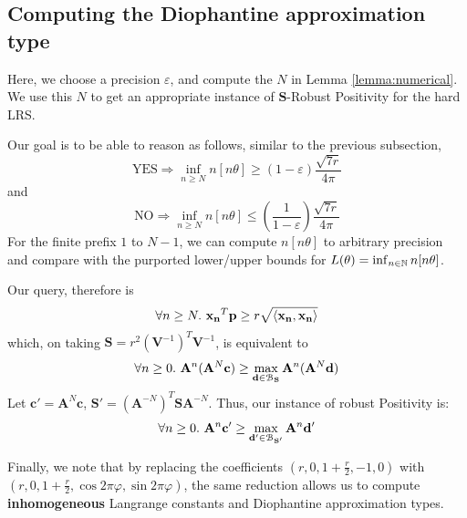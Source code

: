 \subsection{Computing the Diophantine approximation type}
Here, we choose a precision $\varepsilon$, and compute the $N$ in Lemma \ref{lemma:numerical}. We use this $N$ to get an appropriate instance of $\mathbf{S}$-Robust Positivity for the hard LRS. 

Our goal is to be able to reason as follows, similar to the previous subsection, 
$$
\text{YES} \Rightarrow \inf_{n \ge N} n[n\theta] \ge (1 - \varepsilon)\frac{\sqrt{7r}}{4\pi}
$$
and
$$
\text{NO} \Rightarrow \inf_{n \ge N} n[n\theta] \le \left(\frac{1}{1-\varepsilon}\right)\frac{\sqrt{7r}}{4\pi}
$$
For the finite prefix $1$ to $N-1$, we can compute $n[n\theta]$ to arbitrary precision and compare with the purported lower/upper bounds for $L(\theta) = \inf_{n \in \mathbb{N}} n[n\theta]$.

Our query, therefore is
$$
\forall n \ge N.~ \mathbf{x_n}^T\mathbf{p} \ge r\sqrt{\langle\mathbf{x_n}, \mathbf{x_n}\rangle} 
$$
which, on taking $\mathbf{S} = r^2(\mathbf{V}^{-1})^T\mathbf{V}^{-1}$, is equivalent to
$$
\forall n \ge 0.~ \mathbf{A}^n(\mathbf{A}^N\mathbf{c}) \ge \max_{\mathbf{d} \in \mathcal{B}_\mathbf{S}} \mathbf{A}^n(\mathbf{A}^N\mathbf{d})
$$
Let $\mathbf{c'} = \mathbf{A}^N\mathbf{c}$, $\mathbf{S'} = (\mathbf{A}^{-N})^T\mathbf{S}\mathbf{A}^{-N}$. Thus, our instance of robust Positivity is:
$$
\forall n \ge 0.~ \mathbf{A}^n\mathbf{c'} \ge \max_{\mathbf{d'} \in \mathcal{B}_\mathbf{S'}} \mathbf{A}^n\mathbf{d'}
$$

Finally, we note that by replacing the coefficients $(r, 0, 1 + \frac{r}{2}, -1, 0)$ with  $(r, 0, 1 + \frac{r}{2}, \cos 2\pi\varphi, \sin 2\pi\varphi)$, the same reduction allows us to compute \textbf{inhomogeneous} Langrange constants and Diophantine approximation types.
